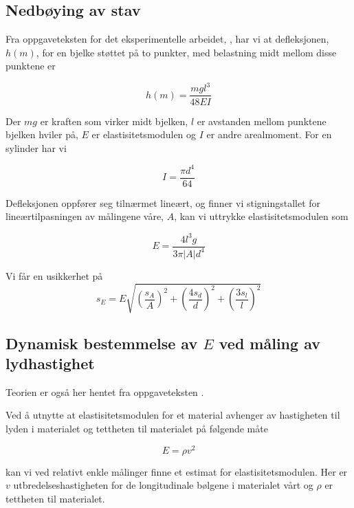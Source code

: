 \documentclass[a4paper,11pt, twocolumn]{article}
\begin{document}
\subsection{Nedbøying av stav}
Fra oppgaveteksten for det eksperimentelle arbeidet, \cite{oppgavetekst}, har vi at defleksjonen, $h(m)$, for en bjelke støttet på to punkter, med belastning midt mellom disse punktene er

\begin{equation}
	h(m) = \frac{mgl^3}{48EI}
	\label{eq:h}
\end{equation}

Der $mg$ er kraften som virker midt bjelken, $l$ er avstanden mellom punktene bjelken hviler på, $E$ er elastisitetsmodulen og $I$ er andre arealmoment. For en sylinder har vi

\begin{equation}
	I = \frac{\pi d^4}{64}
\end{equation}

Defleksjonen oppfører seg tilnærmet lineært, og finner vi stigningstallet for lineærtilpasningen av målingene våre, $A$, kan vi uttrykke elastisitetsmodulen som  

\begin{equation}
	E = \frac{4l^3g}{3\pi |A|d^4}
	\label{eq:elastisitetsmodulDefleksjon}
\end{equation}

Vi får en usikkerhet på
\begin{equation}
	s_E = E\sqrt{\left(\frac{s_A}{A}\right)^2+\left(\frac{4s_d}{d}\right)^2+\left(\frac{3s_l}{l}\right)^2}	
	\label{eq:feilDefleksjon}
\end{equation}


\subsection{Dynamisk bestemmelse av $E$ ved måling av lydhastighet}
Teorien er også her hentet fra oppgaveteksten \cite{oppgavetekst}. 

Ved å utnytte at elastisitetsmodulen for et material avhenger av hastigheten til lyden i materialet og tettheten til materialet på følgende måte

\begin{equation}
	E = \rho v^2
	\label{eq:dynamiskElastisitet}
\end{equation}

kan vi ved relativt enkle målinger finne et estimat for elastisitetsmodulen. Her er $v$ utbredelseshastigheten for de longitudinale bølgene i materialet vårt og $\rho$ er tettheten til materialet.
\end{document}

